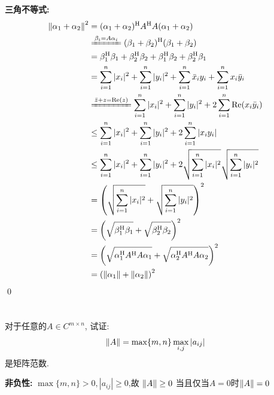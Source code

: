 \documentclass{matrix-homework}
\begin{document}
\textbf{三角不等式:}
\begin{align*}
    \norm{\alpha_1+\alpha_2}^2 & = (\alpha_1+\alpha_2)^\HH A^\HH A(\alpha_1+\alpha_2)                                                                   \\
                               & \xlongequal[]{\beta_i=A\alpha_i} (\beta_1+\beta_2)^\HH(\beta_1+\beta_2)                                                \\
                               & = \beta_1^\HH\beta_1 + \beta_2^\HH\beta_2 + \beta_1^\HH\beta_2 + \beta_2^\HH\beta_1                                    \\
                               & =\sum_{i=1}^{n}|x_i|^2 + \sum_{i=1}^{n}|y_i|^2 + \sum_{i=1}^{n}\bar{x}_iy_i + \sum_{i=1}^{n}x_i\bar{y}_i               \\
                               & \xlongequal[]{\bar{z}+z=\mr{Re}(z)}\sum_{i=1}^{n}|x_i|^2 + \sum_{i=1}^{n}|y_i|^2 +2\sum_{i=1}^{n}\mr{Re}(x_i\bar{y}_i) \\
                               & \le \sum_{i=1}^{n}|x_i|^2 + \sum_{i=1}^{n}|y_i|^2 + 2\sum_{i=1}^{n} |x_iy_i|                                           \\
                               & \le \sum_{i=1}^{n}|x_i|^2 + \sum_{i=1}^{n}|y_i|^2 + 2\sqrt{\sum_{i=1}^{n}|x_i|^2}\sqrt{\sum_{i=1}^{n}|y_i|^2}          \\
                               & =\left(\sqrt{\sum_{i=1}^{n}|x_i|^2} + \sqrt{\sum_{i=1}^{n}|y_i|^2}\right)^2                                            \\
                               & =\left(\sqrt{\beta_1^\HH\beta_1} + \sqrt{\beta_2^\HH\beta_2}\right)^2                                                  \\
                               & =\left(\sqrt{\alpha_1^\HH A^\HH A\alpha_1} + \sqrt{\alpha_2^\HH A^\HH A\alpha_2}\right)^2                              \\
                               & =\left(\norm{\alpha_1} + \norm{\alpha_2}\right)^2
\end{align*}
\qed


\section{}
对于任意的$A\in C^{m\times n}$, 试证: $$\left\lVert A \right\rVert=\max\{m,n\}\max_{i,j}|a_{ij}|$$是矩阵范数.

\answer
\textbf{非负性:} $\max\{m,n\}>0, |a_{ij}|\ge0$,故 $\left\lVert A \right\rVert\ge0$ 当且仅当$A=0$时$\left\lVert A \right\rVert=0$
\end{document}
